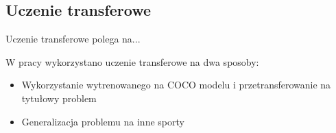 
\subsection{Uczenie transferowe}

Uczenie transferowe polega na...

W pracy wykorzystano uczenie transferowe na dwa sposoby:

\begin{itemize}
	\item Wykorzystanie wytrenowanego na COCO modelu i przetransferowanie na tytułowy problem
	\item Generalizacja problemu na inne sporty
\end{itemize}
